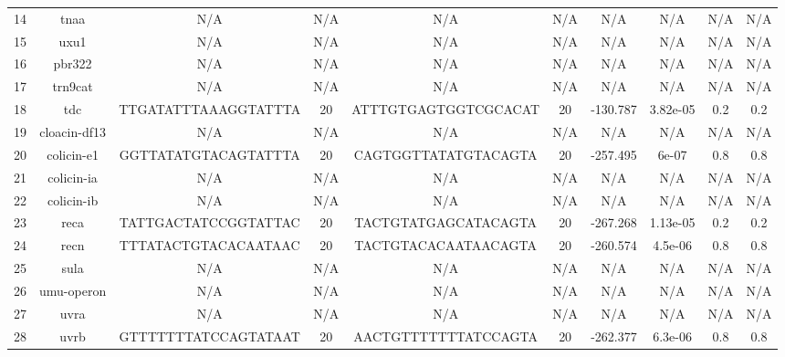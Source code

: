 \documentclass{article}
\begin{document}
\begin{table}
{\begin{tabular}{c|c|c|c|c|c|c|c|c|c}
 14 &          tnaa &                   N/A &   N/A &                   N/A &        N/A &       N/A &        N/A &      N/A &    N/A \\
 15 &          uxu1 &                   N/A &   N/A &                   N/A &        N/A &       N/A &        N/A &      N/A &    N/A \\
 16 &        pbr322 &                   N/A &   N/A &                   N/A &        N/A &       N/A &        N/A &      N/A &    N/A \\
 17 &       trn9cat &                   N/A &   N/A &                   N/A &        N/A &       N/A &        N/A &      N/A &    N/A \\
 18 &           tdc &  TTGATATTTAAAGGTATTTA &    20 &  ATTTGTGAGTGGTCGCACAT &         20 &  -130.787 &   3.82e-05 &      0.2 &    0.2 \\
 19 &  cloacin-df13 &                   N/A &   N/A &                   N/A &        N/A &       N/A &        N/A &      N/A &    N/A \\
 20 &    colicin-e1 &  GGTTATATGTACAGTATTTA &    20 &  CAGTGGTTATATGTACAGTA &         20 &  -257.495 &      6e-07 &      0.8 &    0.8 \\
 21 &    colicin-ia &                   N/A &   N/A &                   N/A &        N/A &       N/A &        N/A &      N/A &    N/A \\
 22 &    colicin-ib &                   N/A &   N/A &                   N/A &        N/A &       N/A &        N/A &      N/A &    N/A \\
 23 &          reca &  TATTGACTATCCGGTATTAC &    20 &  TACTGTATGAGCATACAGTA &         20 &  -267.268 &   1.13e-05 &      0.2 &    0.2 \\
 24 &          recn &  TTTATACTGTACACAATAAC &    20 &  TACTGTACACAATAACAGTA &         20 &  -260.574 &    4.5e-06 &      0.8 &    0.8 \\
 25 &          sula &                   N/A &   N/A &                   N/A &        N/A &       N/A &        N/A &      N/A &    N/A \\
 26 &    umu-operon &                   N/A &   N/A &                   N/A &        N/A &       N/A &        N/A &      N/A &    N/A \\
 27 &          uvra &                   N/A &   N/A &                   N/A &        N/A &       N/A &        N/A &      N/A &    N/A \\
 28 &          uvrb &  GTTTTTTTATCCAGTATAAT &    20 &  AACTGTTTTTTTATCCAGTA &         20 &  -262.377 &    6.3e-06 &      0.8 &    0.8 \\

\end{tabular}}
\end{table}
\end{document}

